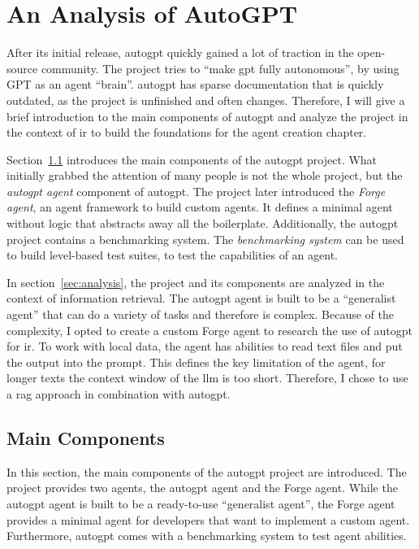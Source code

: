\documentclass[../main.tex]{subfiles}
\begin{document}
\chapter{An Analysis of AutoGPT}
\label{ch:autogpt}

After its initial release,
\gls{autogpt} quickly gained a lot of traction in the open-source community.
The project tries to ``make \gls{gpt} fully autonomous'',
by using GPT as an agent ``brain''.
\gls{autogpt} has sparse documentation that is quickly outdated,
as the project is unfinished and often changes.
Therefore, I will give a brief introduction to the main components of
\gls{autogpt} and analyze the project in the context of \gls{ir} to build
the foundations for the agent creation chapter.

Section~\ref{sec:components} introduces the main components of the \gls{autogpt} project.
What initially grabbed the attention of many people is not the whole project,
but the \emph{\gls{autogpt} agent} component of \gls{autogpt}.
The project later introduced the \emph{Forge agent},
an agent framework to build custom agents.
It defines a minimal agent without logic
that abstracts away all the boilerplate.
Additionally, the \gls{autogpt} project contains a benchmarking system.
The \emph{benchmarking system} can be used to build level-based test suites,
to test the capabilities of an agent.

In section~\ref{sec:analysis}, the project and its components
are analyzed in the context of information retrieval.
The \gls{autogpt} agent is built to be a ``generalist agent'' that can do
a variety of tasks and therefore is complex.
Because of the complexity,
I opted to create a custom Forge agent to research the use of \gls{autogpt} for \gls{ir}.
To work with local data, the agent has abilities to read text files
and put the output into the prompt.
This defines the key limitation of the agent, for longer texts the context
window of the \gls{llm} is too short.
Therefore, I chose to use a \gls{rag} approach in combination with \gls{autogpt}.

\section{Main Components}
\label{sec:components}

In this section, the main components of the \gls{autogpt} project are introduced.
The project provides two agents, the \gls{autogpt} agent and the Forge agent.
While the \gls{autogpt} agent is built to be a ready-to-use ``generalist agent'',
the Forge agent provides a minimal agent for developers that want to implement
a custom agent.
Furthermore, \gls{autogpt} comes with a benchmarking system to test agent abilities.
\end{document}
